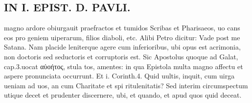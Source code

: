 \documentclass{article}
\begin{document}
\begin{pages}
\section*{IN I. EPIST. D. PAVLI. }
\marginpar{[ p.104 ]}\pstart magno ardore obiurgauit praefractos et tumidos Scribas et Pharisaeos, uo cans eos pro geniem uiperarum, filios diaboli, etc. Alibi Petro dicitur: Vade post me Satana. Nam placide leniterque agere cum inferioribus, ubi opus est acrimonia, non doctoris sed seductoris et corruptoris est. Sic Apostolus quoque ad Galat, cap.3.uocat αὐοήτος, stula tos, amentes: in qua Epistola multa magno affectu et aspere pronunciata occurrunt. Et i. Corinth.4. Quid uultis, inquit, cum uirga ueniam ad uos, an cum Charitate et spi ritulenitatis? Sed interim circumspectum utique decet et prudenter discernere, ubi, et quando, et apud quos quid deceat.  \pend
{}
{}

\end{pages}
\end{document}
